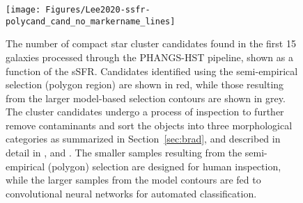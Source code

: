 \begin{figure}
\centering
\texttt{[image: Figures/Lee2020-ssfr-polycand\_cand\_no\_markername\_lines]}
 \caption{The number of compact star cluster candidates found in the first 15 galaxies processed through the PHANGS-HST pipeline, shown as a function of the sSFR.  Candidates identified using the semi-empirical selection (polygon region) are shown in red, while those resulting from the larger model-based selection contours are shown in grey. The cluster candidates undergo a process of inspection to further remove contaminants and sort the objects into three morphological categories as summarized in Section~\ref{sec:brad}, and described in detail in \cite{wei20}, and \citet{whitmore21}.  The smaller samples resulting from the semi-empirical (polygon) selection are designed for human inspection, while the larger samples from the model contours are fed to convolutional neural networks for automated classification.}
 \label{fig:numcandidates}
\end{figure}